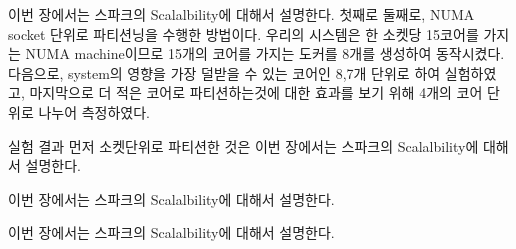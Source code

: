 \fi




\ifkor
이번 장에서는 스파크의 Scalalbility에 대해서 설명한다. 첫째로 
둘째로, NUMA socket 단위로 파티션닝을 수행한 방법이다. 우리의 시스템은 한 소켓당 15코어를
가지는 NUMA machine이므로 15개의 코어를 가지는 도커를 8개를 생성하여 동작시켰다.
다음으로, system의 영향을 가장 덜받을 수 있는 코어인 8,7개 단위로 하여 실험하였고, 
마지막으로 더 적은 코어로 파티션하는것에 대한 효과를 보기 위해 4개의 코어 단위로 나누어 측정하였다. 
\else

\fi




\ifkor
실험 결과 먼저 소켓단위로 파티션한 것은 
이번 장에서는 스파크의 Scalalbility에 대해서 설명한다.
\else

\fi




\ifkor
이번 장에서는 스파크의 Scalalbility에 대해서 설명한다.
\else

\fi



\ifkor
이번 장에서는 스파크의 Scalalbility에 대해서 설명한다.
\else

\fi
